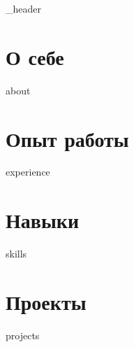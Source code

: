\documentclass[letter, 14pt]{article}
\author{Илья Казаков}
\begin{document}
{_header}
\vspace*{1pt}

\hline
\vspace*{10pt}

\section{О себе}\label{sec:-}
\vspace*{3pt}
{about}
\vspace*{10pt}

\section{Опыт работы}\label{sec:-2}
\vspace*{3pt}
{experience}
\vspace*{10pt}

\section{Навыки}\label{sec:}
\vspace*{3pt}
{skills}
\vspace*{10pt}

\section{Проекты}\label{sec:-2}
\vspace*{3pt}
{projects}
\vspace*{10pt}
\end{document}
